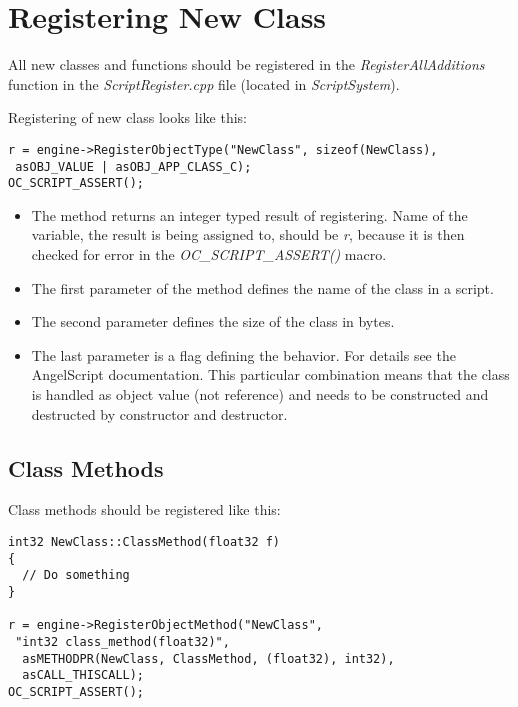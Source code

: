 \documentclass[a4paper, 12pt]{report}
\begin{document}
\section{Registering New Class}

All new classes and functions should be registered in the \emph{RegisterAllAdditions} function in the \emph{ScriptRegister.cpp} file (located in \emph{ScriptSystem}).

Registering of new class looks like this:

\begin{verbatim}
r = engine->RegisterObjectType("NewClass", sizeof(NewClass),
 asOBJ_VALUE | asOBJ_APP_CLASS_C);
OC_SCRIPT_ASSERT();
\end{verbatim}

\begin{itemize}
\item
The method returns an integer typed result of registering. Name of the variable, the result is being assigned to, should be \emph{r}, because it is then checked for error in the \emph{OC\_SCRIPT\_ASSERT()} macro.

\item
The first parameter of the method defines the name of the class in a script.

\item
The second parameter defines the size of the class in bytes.

\item
The last parameter is a flag defining the behavior. For details see the AngelScript documentation. This particular combination means that the class is handled as object value (not reference) and needs to be constructed and destructed by constructor and destructor.
\end{itemize}

\subsection{Class Methods}
Class methods should be registered like this:

\begin{verbatim}
int32 NewClass::ClassMethod(float32 f)
{
  // Do something
}

r = engine->RegisterObjectMethod("NewClass",
 "int32 class_method(float32)", 
  asMETHODPR(NewClass, ClassMethod, (float32), int32),
  asCALL_THISCALL);
OC_SCRIPT_ASSERT();
\end{verbatim}
\end{document}
